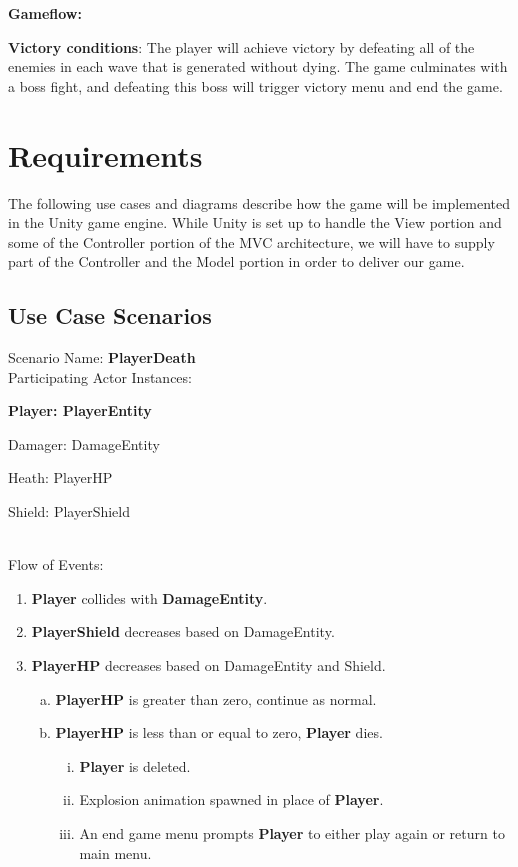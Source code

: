 \documentclass[12pt]{article}       %
\def\hs{\hspace{15pt}}
\begin{document}
{\bf Gameflow:} 


{\bf Victory conditions}: The player will achieve victory by defeating all of the enemies in each wave that is generated without dying. The game culminates with a boss fight, and defeating this boss will trigger victory menu and end the game.

\section{Requirements} %
\label{sec:Requirements}

\hs The following use cases and diagrams describe how the game will be implemented in the Unity game engine. While Unity is set up to handle the View portion and some of the Controller portion of the MVC architecture, we will have to supply part of the Controller and the Model portion in order to deliver our game.

\subsection{Use Case Scenarios} 
Scenario Name: {\bf PlayerDeath} \\
Participating Actor Instances:        \hspace{46pt} {\bf Player: PlayerEntity

					          \hspace{2.6 in}   Damager: DamageEntity 

					          \hspace{2.6in}    Heath: PlayerHP

						\hspace{2.6in}   Shield: PlayerShield} \vspace{10pt}  \\ 
Flow of Events: 
\begin{enumerate} 
\item {\bf Player }collides with {\bf DamageEntity}.
       \item {\bf PlayerShield} decreases based on DamageEntity. 
       \item {\bf PlayerHP} decreases based on DamageEntity and Shield. 
                \begin{enumerate}[a.]
                 \item {\bf PlayerHP} is greater than zero, continue as normal.
                 \item{\bf PlayerHP} is less than or equal to zero, {\bf Player} dies.
                      \begin{enumerate}[i.]
                	\item {\bf Player} is deleted.
                	\item Explosion animation spawned in place of {\bf Player}.
		\item An end game menu prompts {\bf Player} to either play again or return to main menu.
		 \end{enumerate}
                \end{enumerate}
\end{enumerate}
\end{document}
